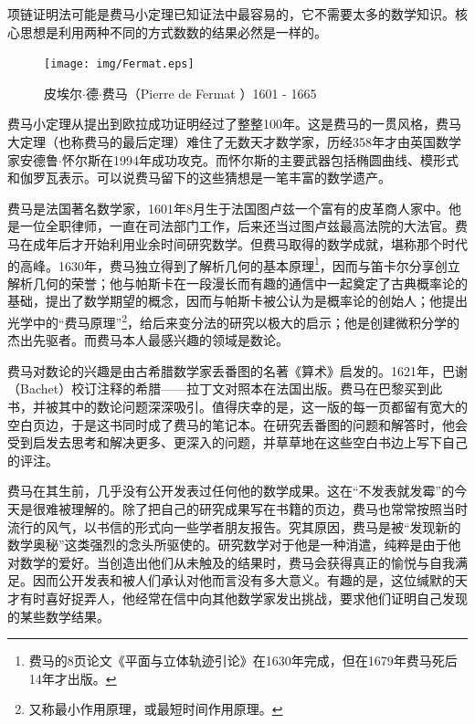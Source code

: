 \documentclass{article}
\begin{document}
项链证明法可能是费马小定理已知证法中最容易的，它不需要太多的数学知识。核心思想是利用两种不同的方式数数的结果必然是一样的。

\begin{figure}
  \centering %
 \texttt{[image: img/Fermat.eps]}
 \captionsetup{labelformat=empty}
 \caption{皮埃尔$\cdot$德$\cdot$费马（Pierre de Fermat ）1601 - 1665}
 \label{fig:Fermat}
\end{figure}

费马小定理从提出到欧拉成功证明经过了整整100年。这是费马的一贯风格，费马大定理（也称费马的最后定理）难住了无数天才数学家，历经358年才由英国数学家安德鲁$\cdot$怀尔斯在1994年成功攻克。而怀尔斯的主要武器包括椭圆曲线、模形式和伽罗瓦表示\cite{HanXueTao2009}。可以说费马留下的这些猜想是一笔丰富的数学遗产。

费马是法国著名数学家，1601年8月生于法国图卢兹一个富有的皮革商人家中。他是一位全职律师，一直在司法部门工作，后来还当过图卢兹最高法院的大法官。费马在成年后才开始利用业余时间研究数学。但费马取得的数学成就，堪称那个时代的高峰。1630年，费马独立得到了解析几何的基本原理\footnote{费马的8页论文《平面与立体轨迹引论》在1630年完成，但在1679年费马死后14年才出版。}，因而与笛卡尔分享创立解析几何的荣誉；他与帕斯卡在一段漫长而有趣的通信中一起奠定了古典概率论的基础，提出了数学期望的概念，因而与帕斯卡被公认为是概率论的创始人；他提出光学中的“费马原理”\footnote{又称最小作用原理，或最短时间作用原理。}，给后来变分法的研究以极大的启示；他是创建微积分学的杰出先驱者。而费马本人最感兴趣的领域是数论。

费马对数论的兴趣是由古希腊数学家丢番图的名著《算术》启发的。1621年，巴谢（Bachet）校订注释的希腊——拉丁文对照本在法国出版。费马在巴黎买到此书，并被其中的数论问题深深吸引。值得庆幸的是，这一版的每一页都留有宽大的空白页边，于是这书同时成了费马的笔记本。在研究丢番图的问题和解答时，他会受到启发去思考和解决更多、更深入的问题，并草草地在这些空白书边上写下自己的评注。

费马在其生前，几乎没有公开发表过任何他的数学成果。这在“不发表就发霉”的今天是很难被理解的。除了把自己的研究成果写在书籍的页边，费马也常常按照当时流行的风气，以书信的形式向一些学者朋友报告。究其原因，费马是被“发现新的数学奥秘”这类强烈的念头所驱使的。研究数学对于他是一种消遣，纯粹是由于他对数学的爱好。当创造出他们从未触及的结果时，费马会获得真正的愉悦与自我满足。因而公开发表和被人们承认对他而言没有多大意义\cite{HanXueTao2009}。有趣的是，这位缄默的天才有时喜好捉弄人，他经常在信中向其他数学家发出挑战，要求他们证明自己发现的某些数学结果。
\end{document}
